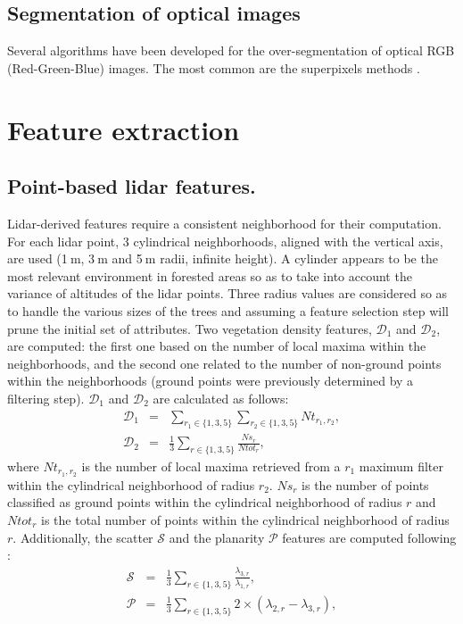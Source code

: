 \subsection{Segmentation of optical images}
Several algorithms have been developed for the over-segmentation of optical RGB (Red-Green-Blue) images. The most common are the superpixels methods \citep{achanta2012slic}.

\section{Feature extraction}
\subsection{Point-based lidar features.}
Lidar-derived features require a consistent neighborhood for their computation. For each lidar point, 3 cylindrical neighborhoods, aligned with the vertical axis, are used (1$\:$m, 3$\:$m and 5$\:$m radii, infinite height). A cylinder appears to be the most relevant environment in forested areas so as to take into account the variance of altitudes of the lidar points. Three radius values are considered so as to handle the various sizes of the trees and assuming a feature selection step will prune the initial set of attributes. {Two vegetation density features, $\mathcal{D}_{1}$ and $\mathcal{D}_{2}$, are computed: the first one based on the number of local maxima within the neighborhoods, and the second one related to the number of non-ground points within the neighborhoods (ground points were previously determined by a filtering step). $\mathcal{D}_{1}$ and $\mathcal{D}_{2}$ are calculated as follows:
\begin{eqnarray}
\mathcal{D}_{1} & = & \sum_{r_{1} \in \{1,3,5\}}\sum_{r_{2} \in \{1,3,5\}}Nt_{r_{1},r_{2}}, \\
\mathcal{D}_{2} & = & \frac{1}{3}\sum_{r \in \{1,3,5\}}\frac{Ns_{r}}{Ntot_{r}},
\end{eqnarray}
where $Nt_{r_{1},r_{2}}$ is the number of local maxima retrieved from a $r_{1}$ maximum filter within the cylindrical neighborhood of radius $r_{2}$. $Ns_{r}$ is the number of points classified as ground points within the cylindrical neighborhood of radius $r$ and $Ntot_{r}$ is the total number of points within the cylindrical neighborhood of radius $r$.} Additionally, the scatter $\mathcal{S}$ and the planarity $\mathcal{P}$ features are computed following \citet{Weinmann2015286}:
\begin{eqnarray}
\mathcal{S} & = & \frac{1}{3}\sum_{r \in \{1,3,5\}}\frac{\lambda_{3,r}}{\lambda_{1,r}}, \\
\mathcal{P} & = & \frac{1}{3}\sum_{r \in \{1,3,5\}}2\times(\lambda_{2,r}-\lambda_{3,r}),
\end{eqnarray}
